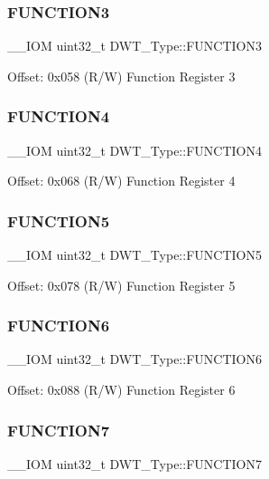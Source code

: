\subsubsection{\texorpdfstring{FUNCTION3}{FUNCTION3}}
{\footnotesize\ttfamily \+\_\+\+\_\+\+I\+OM uint32\+\_\+t D\+W\+T\+\_\+\+Type\+::\+F\+U\+N\+C\+T\+I\+O\+N3}

Offset\+: 0x058 (R/W) Function Register 3 \mbox{\label{struct_d_w_t___type_a2fa7fd33c3fae711e0d0e683f29b5b6d}} 
\subsubsection{\texorpdfstring{FUNCTION4}{FUNCTION4}}
{\footnotesize\ttfamily \+\_\+\+\_\+\+I\+OM uint32\+\_\+t D\+W\+T\+\_\+\+Type\+::\+F\+U\+N\+C\+T\+I\+O\+N4}

Offset\+: 0x068 (R/W) Function Register 4 \mbox{\label{struct_d_w_t___type_a2f33ef0ce606e4850ecde8d044f7bb5b}} 
\subsubsection{\texorpdfstring{FUNCTION5}{FUNCTION5}}
{\footnotesize\ttfamily \+\_\+\+\_\+\+I\+OM uint32\+\_\+t D\+W\+T\+\_\+\+Type\+::\+F\+U\+N\+C\+T\+I\+O\+N5}

Offset\+: 0x078 (R/W) Function Register 5 \mbox{\label{struct_d_w_t___type_aa8f49a707a5d85cf554b9bef54c19380}} 
\subsubsection{\texorpdfstring{FUNCTION6}{FUNCTION6}}
{\footnotesize\ttfamily \+\_\+\+\_\+\+I\+OM uint32\+\_\+t D\+W\+T\+\_\+\+Type\+::\+F\+U\+N\+C\+T\+I\+O\+N6}

Offset\+: 0x088 (R/W) Function Register 6 \mbox{\label{struct_d_w_t___type_ababf5d870650c4a480302b65bdb66741}} 
\subsubsection{\texorpdfstring{FUNCTION7}{FUNCTION7}}
{\footnotesize\ttfamily \+\_\+\+\_\+\+I\+OM uint32\+\_\+t D\+W\+T\+\_\+\+Type\+::\+F\+U\+N\+C\+T\+I\+O\+N7}

